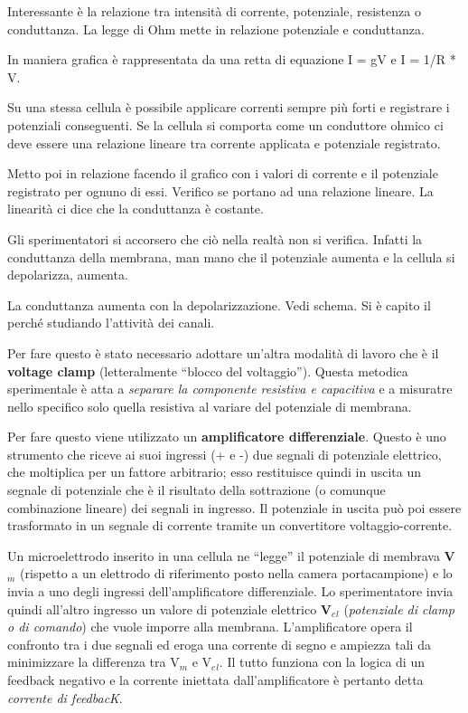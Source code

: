 \documentclass[]{article}
\begin{document}
Interessante è la relazione tra intensità di corrente, potenziale,
resistenza o conduttanza. La legge di Ohm mette in relazione potenziale
e conduttanza.

In maniera grafica è rappresentata da una retta di equazione I = gV e I
= 1/R * V.

Su una stessa cellula è possibile applicare correnti sempre più forti e
registrare i potenziali conseguenti. Se la cellula si comporta come un
conduttore ohmico ci deve essere una relazione lineare tra corrente
applicata e potenziale registrato.

Metto poi in relazione facendo il grafico con i valori di corrente e il
potenziale registrato per ognuno di essi. Verifico se portano ad una
relazione lineare. La linearità ci dice che la conduttanza è costante.

Gli sperimentatori si accorsero che ciò nella realtà non si verifica.
Infatti la conduttanza della membrana, man mano che il potenziale
aumenta e la cellula si depolarizza, aumenta.

La conduttanza aumenta con la depolarizzazione. Vedi schema. Si è capito
il perché studiando l'attività dei canali.

Per fare questo è stato necessario adottare un'altra modalità di lavoro
che è il \textbf{voltage clamp} (letteralmente ``blocco del
voltaggio''). Questa metodica sperimentale è atta a \emph{separare la
componente resistiva e capacitiva} e a misuratre nello specifico solo
quella resistiva al variare del potenziale di membrana.

Per fare questo viene utilizzato un \textbf{amplificatore
differenziale}. Questo è uno strumento che riceve ai suoi ingressi (+ e
-) due segnali di potenziale elettrico, che moltiplica per un fattore
arbitrario; esso restituisce quindi in uscita un segnale di potenziale
che è il risultato della sottrazione (o comunque combinazione lineare)
dei segnali in ingresso. Il potenziale in uscita può poi essere
trasformato in un segnale di corrente tramite un convertitore
voltaggio-corrente.

Un microelettrodo inserito in una cellula ne ``legge'' il potenziale di
membrava \textbf{V\(_m\)} (rispetto a un elettrodo di riferimento posto
nella camera portacampione) e lo invia a uno degli ingressi
dell'amplificatore differenziale. Lo sperimentatore invia quindi
all'altro ingresso un valore di potenziale elettrico
\textbf{V\(_c\)\(_l\)} (\emph{potenziale di clamp o di comando}) che
vuole imporre alla membrana. L'amplificatore opera il confronto tra i
due segnali ed eroga una corrente di segno e ampiezza tali da
minimizzare la differenza tra V\(_m\) e V\(_c\)\(_l\). Il tutto funziona
con la logica di un feedback negativo e la corrente iniettata
dall'amplificatore è pertanto detta \emph{corrente di feedbacK}.
\end{document}
